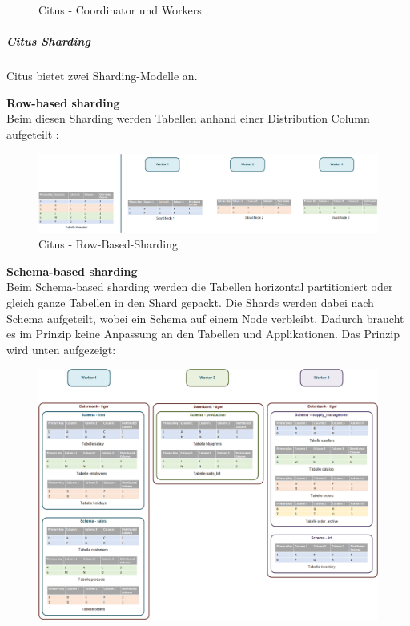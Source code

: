 \begin{flushleft}
\begin{flushleft}
\begin{figure}[H]
            \caption{Citus - Coordinator und Workers}
            \label{fig:citus_coordinator_worker}
        \end{figure}
    \end{flushleft}
    \begin{flushleft}
        \subparagraph{Citus Sharding}
        \label{subpar:citus_sharding}
        Citus bietet zwei Sharding-Modelle an.
        \begin{flushleft}
            \textbf{Row-based sharding}\\
            Beim diesen Sharding werden Tabellen anhand einer Distribution Column aufgeteilt \cite{2Y5FA36C, FDUUL9IM}:
            \begin{figure}[H]
                \centering
                \includegraphics[width=0.8\linewidth]{source/implementation/evaluation/postgresql_ha_solutions/stackgres/citus_row-based-sharding}
                \caption{Citus - Row-Based-Sharding}
                \label{fig:citus_row-based-sharding}
            \end{figure}
        \end{flushleft}
        \begin{flushleft}
            \textbf{Schema-based sharding}\\
            Beim Schema-based sharding werden die Tabellen horizontal partitioniert oder gleich ganze Tabellen in den Shard gepackt.
            Die Shards werden dabei nach Schema aufgeteilt, wobei ein Schema auf einem Node verbleibt.
            Dadurch braucht es im Prinzip keine Anpassung an den Tabellen und Applikationen.
            Das Prinzip wird unten aufgezeigt:
            \begin{figure}[H]
                \centering
                \includegraphics[width=0.8\linewidth]{source/implementation/evaluation/postgresql_ha_solutions/stackgres/citus_schema-based-sharding}

\end{figure}
\end{flushleft}
\end{flushleft}
\end{flushleft}
